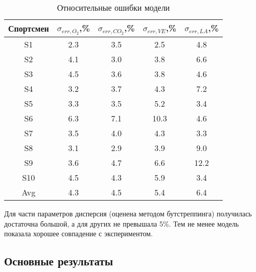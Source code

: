 \begin{table}[!ht]
\centering
\caption{Относительные ошибки модели}
\medskip
\label{tabular:tab3}
\begin{tabular}{|c|c|c|c|c|}
\hline
Спортсмен & \(\sigma_{err,O_{2}}\),\%  & \(\sigma_{err,CO_{2}}\),\% & \(\sigma_{err,VE}\),\% & \(\sigma_{err,LA}\),\%\\
\hline
S1 & 2.3 & 3.5 & 2.5 & 4.8 \\
\hline
S2 & 4.1 & 3.0 & 3.8 & 6.6 \\
\hline
S3 & 4.5 & 3.6 & 3.8 & 4.6  \\
\hline
S4 & 3.2 & 3.7 & 4.3 & 7.2  \\
\hline
S5 & 3.3 & 3.5 & 5.2 & 3.4  \\
\hline
S6 & 6.3 & 7.1 & 10.3 & 4.6  \\
\hline
S7 & 3.5 & 4.0 & 4.3 & 3.3  \\
\hline
S8 & 3.1 & 2.9 & 3.9 & 9.0  \\
\hline
S9 & 3.6 & 4.7 & 6.6 & 12.2  \\
\hline
S10 & 4.5 & 4.3 & 5.9 & 3.4  \\
\hline
Avg & 4.3 & 4.5 & 5.4 & 6.4  \\
\hline
\end{tabular}
\end{table}

Для части параметров дисперсия (оценена методом бутстреппинга) получилась достаточна большой, а для других не превышала 5\%. Тем не менее модель показала хорошее совпадение с экспериментом.

\subsection*{\Large Основные результаты}

